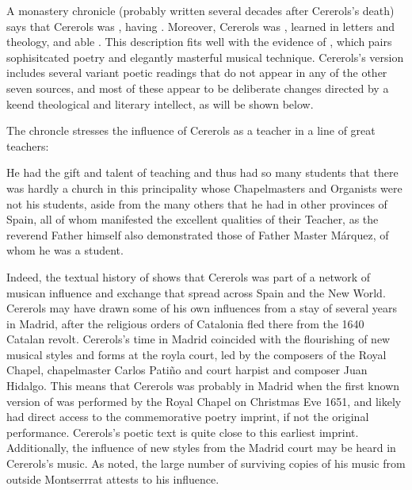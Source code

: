 A monastery chronicle (probably written several decades after Cererols's death)
says that Cererols was , having .
Moreover, Cererols was , learned in letters and
theology, and able .%
    \Autocite
    [{\XXX[original]}]
    [7, note 2]
    {Estrada:CererolsBio}
This description fits well with the evidence of ,
which pairs sophisitcated poetry and elegantly masterful musical technique.
Cererols's version includes several variant poetic readings that do not appear
in any of the other seven sources, and most of these appear to be deliberate
changes directed by a keend theological and literary intellect, as will be shown
below.

The chroncle stresses the influence of Cererols as a teacher in a line of great
teachers:
\begin{quoting}
    He had the gift and talent of teaching and thus had so many students that
    there was hardly a church in this principality  whose
    Chapelmasters and Organists were not his students, aside from the many
    others that he had in other provinces of Spain, all of whom manifested the
    excellent qualities of their Teacher, as the reverend Father himself also
    demonstrated those of Father Master Márquez, of whom he  was a
    student.
\end{quoting}
Indeed, the textual history of  shows that Cererols
was part of a network of musican influence and exchange that spread across Spain
and the New World. 
Cererols may have drawn some of his own influences from a stay of several years
in Madrid, after the religious orders of Catalonia fled there from the 1640
Catalan revolt.
Cererols's time in Madrid coincided with the flourishing of new musical styles
and forms at the royla court, led by the composers of the Royal Chapel,
chapelmaster Carlos Patiño and court harpist and composer Juan Hidalgo.
This means that Cererols was probably in Madrid when the first known version of
 was performed by the Royal Chapel on Christmas Eve
1651, and likely had direct access to the commemorative poetry imprint, if not
the original performance.
Cererols's poetic text is quite close to this earliest imprint.
Additionally, the influence of new styles from the Madrid court may be heard in
Cererols's music.
As noted, the large number of surviving copies of his music from outside
Montserrrat attests to his influence.


